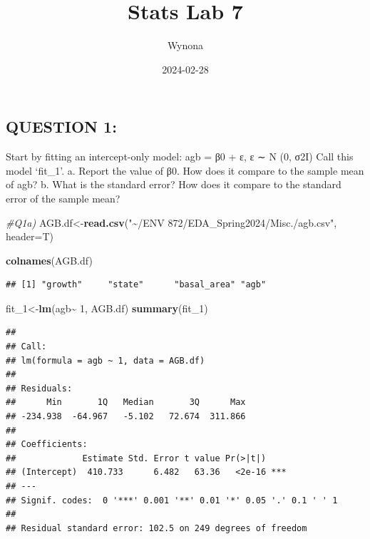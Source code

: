 \documentclass[
]{article}
\title{Stats Lab 7}
\author{Wynona}
\date{2024-02-28}
\newenvironment{Shaded}{\begin{snugshade}}{\end{snugshade}}
\newcommand{\AttributeTok}[1]{\textcolor[rgb]{0.13,0.29,0.53}{#1}}
\newcommand{\CommentTok}[1]{\textcolor[rgb]{0.56,0.35,0.01}{\textit{#1}}}
\newcommand{\DecValTok}[1]{\textcolor[rgb]{0.00,0.00,0.81}{#1}}
\newcommand{\FunctionTok}[1]{\textcolor[rgb]{0.13,0.29,0.53}{\textbf{#1}}}
\newcommand{\NormalTok}[1]{#1}
\newcommand{\OtherTok}[1]{\textcolor[rgb]{0.56,0.35,0.01}{#1}}
\newcommand{\SpecialCharTok}[1]{\textcolor[rgb]{0.81,0.36,0.00}{\textbf{#1}}}
\newcommand{\StringTok}[1]{\textcolor[rgb]{0.31,0.60,0.02}{#1}}
\begin{document}
\maketitle

\hypertarget{question-1}{%
\subsection{QUESTION 1:}\label{question-1}}

Start by fitting an intercept-only model: agb = β0 + ε, ε ∼ N (0, σ2I)
Call this model `fit\_1'. a. Report the value of β0. How does it compare
to the sample mean of agb? b. What is the standard error? How does it
compare to the standard error of the sample mean?

\begin{Shaded}
\begin{Highlighting}[]
\CommentTok{\#Q1a)}
\NormalTok{AGB.df}\OtherTok{\textless{}{-}}\FunctionTok{read.csv}\NormalTok{(}\StringTok{"\textasciitilde{}/ENV 872/EDA\_Spring2024/Misc./agb.csv"}\NormalTok{, }\AttributeTok{header=}\NormalTok{T)}

\FunctionTok{colnames}\NormalTok{(AGB.df)}
\end{Highlighting}
\end{Shaded}

\begin{verbatim}
## [1] "growth"     "state"      "basal_area" "agb"
\end{verbatim}

\begin{Shaded}
\begin{Highlighting}[]
\NormalTok{fit\_1}\OtherTok{\textless{}{-}}\FunctionTok{lm}\NormalTok{(agb}\SpecialCharTok{\textasciitilde{}} \DecValTok{1}\NormalTok{, AGB.df)}
\FunctionTok{summary}\NormalTok{(fit\_1)}
\end{Highlighting}
\end{Shaded}

\begin{verbatim}
## 
## Call:
## lm(formula = agb ~ 1, data = AGB.df)
## 
## Residuals:
##      Min       1Q   Median       3Q      Max 
## -234.938  -64.967   -5.102   72.674  311.866 
## 
## Coefficients:
##             Estimate Std. Error t value Pr(>|t|)    
## (Intercept)  410.733      6.482   63.36   <2e-16 ***
## ---
## Signif. codes:  0 '***' 0.001 '**' 0.01 '*' 0.05 '.' 0.1 ' ' 1
## 
## Residual standard error: 102.5 on 249 degrees of freedom
\end{verbatim}
\end{document}
